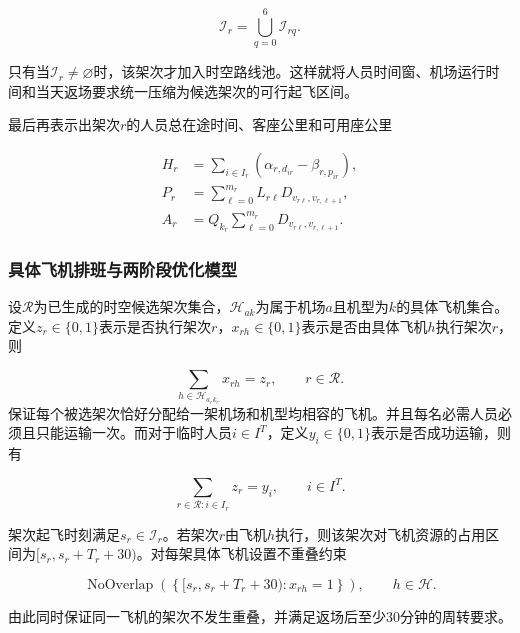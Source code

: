 \documentclass[UTF-8,a4paper,zihao=-4]{ctexart}
\begin{document}
\begin{equation}
\mathcal{I}_r
=
\bigcup_{q=0}^{6}
\mathcal{I}_{rq}.
\end{equation}

只有当$\mathcal{I}_r\neq\varnothing$时，该架次才加入时空路线池。这样就将人员时间窗、机场运行时间和当天返场要求统一压缩为候选架次的可行起飞区间。

最后再表示出架次$r$的人员总在途时间、客座公里和可用座公里

\begin{equation}
\begin{aligned}
H_r
&=
\sum_{i\in I_r}
\left(
\alpha_{r,d_{ir}}
-
\beta_{r,p_{ir}}
\right),\\
P_r
&=
\sum_{\ell=0}^{m_r}
L_{r\ell}D_{v_{r\ell},v_{r,\ell+1}},\\
A_r
&=
Q_{k_r}
\sum_{\ell=0}^{m_r}
D_{v_{r\ell},v_{r,\ell+1}}.
\end{aligned}
\end{equation}

\subsubsection{具体飞机排班与两阶段优化模型}

设$\mathcal{R}$为已生成的时空候选架次集合，$\mathcal{H}_{ak}$为属于机场$a$且机型为$k$的具体飞机集合。定义$z_r\in\{0,1\}$表示是否执行架次$r$，$x_{rh}\in\{0,1\}$表示是否由具体飞机$h$执行架次$r$，则

\begin{equation}
\sum_{h\in\mathcal{H}_{a_rk_r}}
x_{rh}
=
z_r,
\qquad
r\in\mathcal{R}.
\end{equation}
保证每个被选架次恰好分配给一架机场和机型均相容的飞机。并且每名必需人员必须且只能运输一次。而对于临时人员$i\in I^{T}$，定义$y_i\in\{0,1\}$表示是否成功运输，则有

\begin{equation}
\sum_{r\in\mathcal{R}:i\in I_r}
z_r
=
y_i,
\qquad
i\in I^{T}.
\end{equation}

架次起飞时刻满足$s_r\in\mathcal{I}_r$。若架次$r$由飞机$h$执行，则该架次对飞机资源的占用区间为$[s_r,s_r+T_r+30)$。对每架具体飞机设置不重叠约束

\begin{equation}
\operatorname{NoOverlap}
\left(
\left\{
[s_r,s_r+T_r+30):
x_{rh}=1
\right\}
\right),
\qquad
h\in\mathcal{H}.
\end{equation}

由此同时保证同一飞机的架次不发生重叠，并满足返场后至少30分钟的周转要求。
\end{document}
